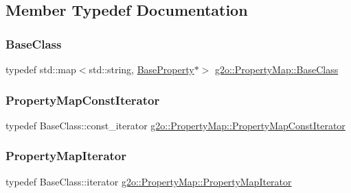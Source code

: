 \subsection{Member Typedef Documentation}
\mbox{\label{classg2o_1_1_property_map_ac57ddbe51d16070e697fe314889fee03}} 
\subsubsection{\texorpdfstring{Base\+Class}{BaseClass}}
{\footnotesize\ttfamily typedef std\+::map$<$std\+::string, \mbox{\hyperlink{classg2o_1_1_base_property}{Base\+Property}}$\ast$$>$ \mbox{\hyperlink{classg2o_1_1_property_map_ac57ddbe51d16070e697fe314889fee03}{g2o\+::\+Property\+Map\+::\+Base\+Class}}}

\mbox{\label{classg2o_1_1_property_map_af09ea140ab099b1762e9634b7fdcaf52}} 
\subsubsection{\texorpdfstring{Property\+Map\+Const\+Iterator}{PropertyMapConstIterator}}
{\footnotesize\ttfamily typedef Base\+Class\+::const\+\_\+iterator \mbox{\hyperlink{classg2o_1_1_property_map_af09ea140ab099b1762e9634b7fdcaf52}{g2o\+::\+Property\+Map\+::\+Property\+Map\+Const\+Iterator}}}

\mbox{\label{classg2o_1_1_property_map_af5dd0defe4a5096f0d5602b38e837a78}} 
\subsubsection{\texorpdfstring{Property\+Map\+Iterator}{PropertyMapIterator}}
{\footnotesize\ttfamily typedef Base\+Class\+::iterator \mbox{\hyperlink{classg2o_1_1_property_map_af5dd0defe4a5096f0d5602b38e837a78}{g2o\+::\+Property\+Map\+::\+Property\+Map\+Iterator}}}




